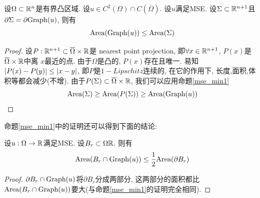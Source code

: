 \begin{proposition}\label{mse_min2}
    设$\Omega \subset \mathbb{R}^n$是有界凸区域. 设$u \in C^2(\Omega) \cap C(\overline{\Omega})$. 设$u$满足MSE. 设$\Sigma\subset \mathbb{R}^{n+1}$且$\partial \Sigma = \partial \text{Graph}(u)$, 则有
    \begin{equation}
        \text{Area}(\text{Graph}(u)) \le \text{Area}(\Sigma)
    \end{equation}
\end{proposition}
\begin{proof}
    设$P:\mathbb{R}^{n+1} \subset \overline{\Omega} \times \mathbb{R}$是 nearest point projection, 即$\forall x \in \mathbb{R}^{n+1}$, $P(x)$是$\overline{\Omega}\times \mathbb{R}$中离 $x$最近的点. 由于$\Omega$是凸的, $P(x)$存在且唯一. 易知$\left | P(x)-P(y) \right | \le \left | x-y \right |$, 即$P$是$1-Lipschitz$连续的, 在它的作用下, 长度,面积,体积等都会减少(不增). 由于$P(\Sigma) \subset \overline{\Omega} \times \mathbb{R}$, 我们可以应用命题\eqref{mse_min1}
    \begin{equation}
        \text{Area}(\Sigma) \ge \text{Area}(P(\Sigma)) \ge \text{Area}(\text{Graph}(u))
    \end{equation}
\end{proof}
命题\eqref{mse_min1}中的证明还可以得到下面的结论:
\begin{corollary}
    设$u: \Omega \to \mathbb{R}$满足MSE. 设$B_r \subset \Omega \mathbb{R}$. 则有
    \begin{equation}
        \text{Area}(B_r \cap \text{Graph}(u)) \le \frac{1}{2} \text{Area}(\partial B_r)
    \end{equation}
\end{corollary}
\begin{proof}
    $\partial B_r \cap \text{Graph}(u)$将$\partial B_r$分成两部分, 这两部分的面积都比$\text{Area}(B_r\cap \text{Graph}(u))$要大(与命题\eqref{mse_min1}的证明完全相同).
\end{proof}
